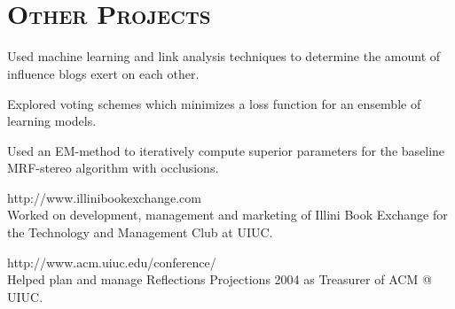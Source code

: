 \begin{resume}
 \begin{formatb}
   \\
   \body\\
 \end{formatb}


\section{\textsc{Other Projects}}

\begin{position}
Used machine learning and link analysis techniques to determine the amount of influence blogs exert on each other.
\end{position}

\begin{position}
Explored voting schemes which minimizes a loss function for an ensemble of learning models. 
\end{position}

\begin{position}
Used an EM-method to iteratively compute superior parameters for the baseline MRF-stereo algorithm with occlusions.
\end{position}

\begin{position}
http://www.illinibookexchange.com\\
Worked on development, management and marketing of Illini Book Exchange for the Technology and Management Club at UIUC. 
\end{position}

\begin{position}
http://www.acm.uiuc.edu/conference/\\
Helped plan and manage Reflections Projections 2004 as Treasurer of ACM @ UIUC.
\end{position}



\end{resume}
